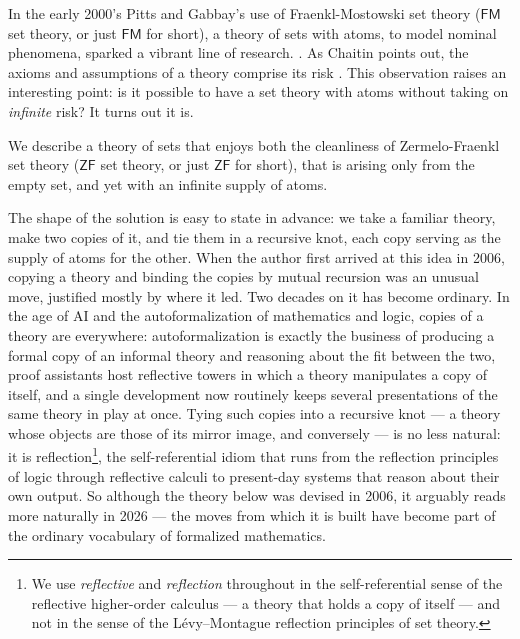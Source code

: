 \documentclass[12pt]{llncs}
\begin{document}
\lstset{language=[Objective]Caml,frame=shadowbox}




In the early 2000's Pitts and Gabbay's use of Fraenkl-Mostowski set
theory ($\mathsf{FM}$ set theory, or just $\mathsf{FM}$ for short), a
theory of sets with atoms, to model nominal phenomena, sparked a
vibrant line of research. \cite{DBLP:journals/fac/GabbayP02}
\cite{DBLP:journals/jcss/Clouston14}. As Chaitin points out, the
axioms and assumptions of a theory comprise its risk
\cite{chaitin1999unknowable}. This observation raises an interesting
point: is it possible to have a set theory with atoms without taking
on \emph{infinite} risk? It turns out it is.

We describe a theory of sets that enjoys both the cleanliness of
Zermelo-Fraenkl set theory ($\mathsf{ZF}$ set theory, or just
$\mathsf{ZF}$ for short), that is arising only from the empty set, and
yet with an infinite supply of atoms.

The shape of the solution is easy to state in advance: we take a
familiar theory, make two copies of it, and tie them in a recursive
knot, each copy serving as the supply of atoms for the other. When the
author first arrived at this idea in 2006, copying a theory and binding
the copies by mutual recursion was an unusual move, justified mostly by
where it led. Two decades on it has become ordinary. In the age of AI
and the autoformalization of mathematics and logic, copies of a theory
are everywhere: autoformalization is exactly the business of producing a
formal copy of an informal theory and reasoning about the fit between
the two, proof assistants host reflective towers in which a theory
manipulates a copy of itself, and a single development now routinely
keeps several presentations of the same theory in play at once. Tying
such copies into a recursive knot --- a theory whose objects are those
of its mirror image, and conversely --- is no less natural: it is
reflection\footnote{We use \emph{reflective} and \emph{reflection} throughout in
the self-referential sense of the reflective higher-order calculus --- a theory
that holds a copy of itself --- and not in the sense of the
L\'evy--Montague reflection principles of set theory.}, the self-referential
idiom that runs from the reflection
principles of logic through reflective calculi
\cite{DBLP:journals/entcs/MeredithR05} to present-day systems that reason
about their own output. So although the theory below was devised in
2006, it arguably reads more naturally in 2026 --- the moves from which
it is built have become part of the ordinary vocabulary of formalized
mathematics.



















   

\end{document}
